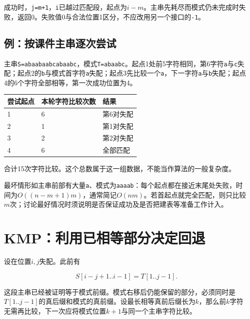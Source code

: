 成功时，\texttt{j=\allowbreak{}m+\allowbreak{}1}，\texttt{i}已越过匹配段，起点为\(i-m\)。主串先耗尽而模式仍未完成时失败，返回0。失败值0与合法位置1区分，不应改用另一个接口的\texttt{-1}。

\subsection{例：按课件主串逐次尝试}\label{DS04-naive-example}

主串\texttt{S=\allowbreak{}abaabaabcabaabc}，模式\texttt{T=\allowbreak{}abaabc}。起点1处前5字符相同，第6字符\texttt{a}与\texttt{c}失配；起点2的\texttt{b}与模式首字符\texttt{a}失配；起点3先比较一个\texttt{a}，下一字符\texttt{a}与\texttt{b}失配；起点4的6个字符全部相等，第一次成功位置为4。

\par\medskip\noindent\begin{minipage}{\linewidth}\fontsize{9.3}{12}\selectfont\begin{tabularx}{\linewidth}{@{}YYY@{}}
\toprule\noalign{}
尝试起点 & 本轮字符比较次数 & 结果 \\
\midrule\noalign{}


1 & 6 & 第6对失配 \\
2 & 1 & 第1对失配 \\
3 & 2 & 第2对失配 \\
4 & 6 & 全部匹配 \\
\bottomrule\end{tabularx}
\end{minipage}\par\medskip

合计15次字符比较。这个总数属于这一组数据，不能当作算法的一般复杂度。

最坏情形如主串前部有大量\texttt{a}、模式为\texttt{aaaab}：每个起点都在接近末尾处失败，时间为\(O((n-m+1)m)\)，通常简记\(O(nm)\)。若首起点就完全匹配，则只比较\(m\)次；讨论最好情况时须说明是否保证成功及是否把建表等准备工作计入。

\section{KMP：利用已相等部分决定回退}\label{DS04-03}

设在位置\(i,j\)失配。此前有

\[S[i-j+1..i-1]=T[1..j-1].\]

这段主串已经被证明等于模式前缀。模式右移后仍能保留的部分，必须同时是\(T[1..j-1]\)的真后缀和模式的真前缀。设最长相等真前后缀长为\(k\)，那么前\(k\)字符无需再比较，下一次应将模式位置\(k+1\)与同一个主串字符比较。

